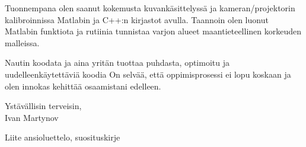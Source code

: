 \documentclass[]{article}
\begin{document}
\noindent
Tuonnempana olen saanut kokemusta kuvank\"asittelyss\"a ja kameran/projektorin
kalibroinnissa Matlabin ja C++:n kirjastot avulla. Taannoin olen luonut Matlabin
funktiota ja rutiinia tunnistaa varjon alueet maantieteellinen korkeuden
malleissa.\medskip

\noindent
Nautin koodata ja aina yrit\"an tuottaa puhdasta, optimoitu ja
uudelleenk\"aytett\"avi\"a koodia On selv\"a\"a, ett\"a oppimisprosessi ei lopu
koskaan ja olen innokas kehitt\"a\"a osaamistani edelleen.
\medskip

\noindent

\bigskip

\noindent
Yst\"av\"allisin terveisin,\\
Ivan Martynov\bigskip

\noindent
Liite	ansioluettelo, suosituskirje
\end{document}
